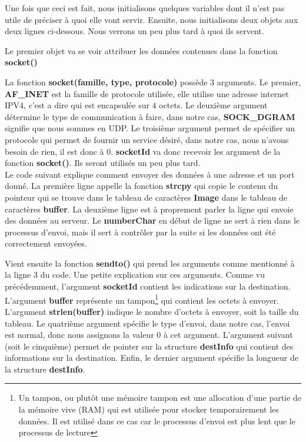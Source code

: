 \documentclass[a4paper,11pt]{report}
\begin{document}
{\begin{enumerate}
\begin{enumerate}
Une fois que ceci est fait, nous initialisons quelques variables dont il n'est pas utile de préciser à quoi elle vont servir. Ensuite, nous initialisons deux objets aux deux lignes ci-dessous. Nous verrons un peu plus tard à quoi ils servent. 

Le premier objet va se voir attribuer les données contenues dans la fonction \textbf{socket()}

La fonction \textbf{socket(famille, type, protocole)} possède 3 arguments. Le premier, \textbf{AF\_INET} est la famille de protocole utilisée, elle utilise une adresse internet IPV4, c'est a dire qui est encapsulée sur 4 octets. Le deuxième argument détermine le type de communication à faire, dans notre cas, \textbf{SOCK\_DGRAM} signifie que nous sommes en UDP. Le troisième argument permet de spécifier un protocole qui permet de fournir un service désiré, dans notre cas, nous n'avons besoin de rien, il est donc à $0$. \textbf{socketId} va donc recevoir les argument de la fonction \textbf{socket()}. Ils seront utilisés un peu plus tard.\\

Le code suivant explique comment envoyer des données à une adresse et un port donné. La première ligne appelle la fonction \textbf{strcpy} qui copie le contenu du pointeur qui se trouve dans le tableau de caractères \textbf{Image} dans le tableau de caractères \textbf{buffer}. La deuxième ligne est à proprement parler la ligne qui envoie des données au serveur. Le \textbf{numberChar} en début de ligne ne sert à rien dans le processus d'envoi, mais il sert à contrôler par la suite si les données ont été correctement envoyées. 



Vient ensuite la fonction \textbf{sendto()} qui prend les arguments comme mentionné à la ligne 3 du code. Une petite explication sur ces arguments. Comme vu précédemment, l'argument \textbf{socketId} contient les indications sur la destination. L'argument \textbf{buffer} représente un tampon\footnote{Un tampon, ou plutôt une mémoire tampon est une allocation d'une partie de la mémoire vive (RAM) qui est utilisée pour stocker temporairement les données. Il est utilisé dans ce cas car le processus d'envoi est plus lent que le processus de lecture} qui contient les octets à envoyer. L'argument \textbf{strlen(buffer)} indique le nombre d'octets à envoyer, soit la taille du tableau. Le quatrième argument spécifie le type d'envoi, dans notre cas, l'envoi est normal, donc nous assignons la valeur $0$ à cet argument. L'argument suivant (soit le cinquième) permet de pointer sur la structure \textbf{destInfo} qui contient des informations sur la destination. Enfin, le dernier argument spécifie la longueur de la structure \textbf{destInfo}.


\end{enumerate}
\end{enumerate}}
\end{document}
